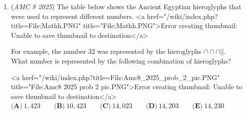 \begin{enumerate}
 



\textbf{Solution 3}

There are $4$ squares that are entirely shaded and $4$ squares that have no shading. This cancels them out. The rest of the squares are half-half. Therefore the shaded region is $\boxed{\textbf{(B)}~50}$ percent of the grid.

 



\textbf{Solution 4}

Note that we can move one triangle from each of the four cells in the middle to each of the four corners. This will leave every cell in the grid with one triangle each, and each triangle has an area of half the area of each cell. Thus, our answer must equal to $\frac{1}{2}$, and so our answer is $\boxed{\textbf{(B)}~50}.$~derekwang2048

 



\textbf{Solution 5}

The shaded area is a $2 \times 2$ square in the middle of the figure combined with $8$ small triangles. Since each small triangle is $\frac{1}{2}$ of a unit square, the star's area is equal to the area of $4 + 8 \cdot \frac{1}{2} = 8$ unit squares, which $\boxed{\textbf{(B)}~50}$ percent of the grid.

 -vockey

 



\textbf{Solution 6}

You can move the extra half a squares and make 4 squares so there are 8/16. The answer is $\boxed{\textbf{(B)}~50}$ percent of 16.

 William

 


	\item (\textit{AMC 8 2025}) The table below shows the Ancient Egyptian hieroglyphs that were used to represent different numbers.
<a href="/wiki/index.php?title=File:Mathh.PNG" title="File:Mathh.PNG">Error creating thumbnail: Unable to save thumbnail to destination</a>


 For example, the number $32$ was represented by the hieroglyphs $\cap \cap \cap ||$. What number is represented by the following combination of hieroglyphs?


 <a href="/wiki/index.php?title=File:Amc8\_2025\_prob\_2\_pic.PNG" title="File:Amc8 2025 prob 2 pic.PNG">Error creating thumbnail: Unable to save thumbnail to destination</a>
$\textbf{(A)}\ 1,423 \qquad \textbf{(B)}\ 10,423 \qquad \textbf{(C)}\ 14,023 \qquad \textbf{(D)}\ 14,203 \qquad \textbf{(E)}\ 14,230$


\end{enumerate}
